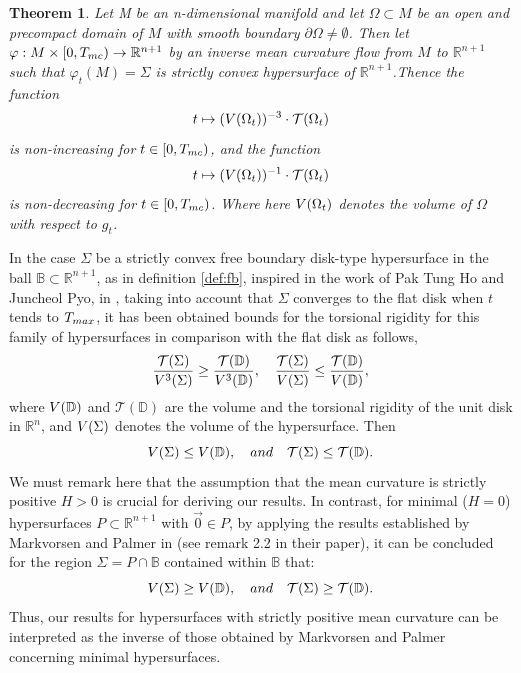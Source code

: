 \documentclass{amsart}
\newtheorem{lettertheorem}{Theorem}
\theoremstyle{definition}
\theoremstyle{remark}
\newcommand{\V}{{\rm V}}
\begin{document}
\begin{lettertheorem}\label{teo:unua}
Let M be an n-dimensional manifold and let $\Omega\subset M$ be an open and precompact domain of $M$ with smooth boundary $\partial \Omega\neq \emptyset$. Then let
    $\varphi:M\times[0,T_{\rm mc})\to \mathbb{R}^{n+1}$ by an inverse mean curvature flow from $M$ to $\mathbb{R}^{n+1}$ such that $\varphi_t(M)=\Sigma$ is strictly  convex hypersurface of $\mathbb{R}^{n+1}$.Thence the function
    $$
 t\mapsto ({\rm V}(\Omega_t))^{-3}\cdot\mathcal{T}(\Omega_t)
    $$
    is non-increasing for $t\in [0,T_{\rm mc})$, and the function
    $$
 t\mapsto ({\rm V}(\Omega_t))^{-1}\cdot\mathcal{T}(\Omega_t)
    $$
    is non-decreasing for $t\in [0,T_{\rm mc})$. Where here  ${\rm V}(\Omega_t)$ denotes the volume of $\Omega$ with respect to $g_t$.
\end{lettertheorem}
In the case $\Sigma$ be a strictly convex free boundary disk-type hypersurface  in the ball $\mathbb{B}\subset \mathbb{R}^{n+1}$, as in definition \ref{def:fb}, inspired in the work of Pak Tung Ho and Juncheol Pyo, in \cite{Ho-Pyo}, taking into account that $\Sigma$ converges to the flat disk when $t$ tends to $T_{\rm max}$, it has been obtained bounds for the torsional rigidity for this family of hypersurfaces in comparison with the flat disk as follows,
$$
\frac{\mathcal{T}(\Sigma)}{\V^3(\Sigma)}\geq \frac{\mathcal{T}(\mathbb{D})}{\V^3(\mathbb{D})},\quad \frac{\mathcal{T}(\Sigma)}{\V(\Sigma)}\leq \frac{\mathcal{T}(\mathbb{D})}{\V(\mathbb{D})},
$$
where $\V(\mathbb{D})$ and $\mathcal{T}(\mathbb{D})$ are the volume and the torsional rigidity of the unit disk in $\mathbb{R}^n$, and $\V(\Sigma)$ denotes the volume of the hypersurface.   Then
    $$
\V(\Sigma)\leq \V(\mathbb{D}),\quad   {\rm and}\quad \mathcal{T}(\Sigma)\leq \mathcal{T}(\mathbb{D}).
    $$
We must remark here that the assumption that the mean curvature is strictly positive $H>0$ is crucial for deriving our results. In contrast, for minimal ($H=0$) hypersurfaces $P\subset \mathbb{R}^{n+1}$ with $\vec{0}\in P$, by applying the results established by Markvorsen and Palmer in \cite{MARKVORSEN_PALMER_2006} (see remark 2.2 in their paper), it can be concluded for the region $\Sigma=P\cap \mathbb{B}$ contained within $\mathbb{B}$ that:
    $$
\V(\Sigma)\geq \V(\mathbb{D}),\quad {\rm and}\quad    
\mathcal{T}(\Sigma)\geq \mathcal{T}(\mathbb{D}).
    $$
Thus, our results for hypersurfaces with strictly positive mean curvature can be interpreted as the inverse of those obtained by Markvorsen and Palmer concerning minimal hypersurfaces.
\end{document}
